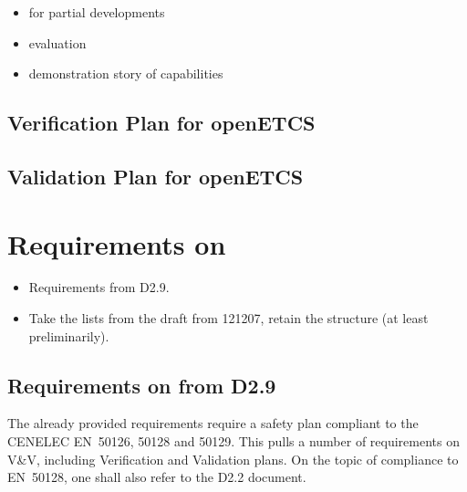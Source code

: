 \documentclass{template/openetcs_report}
\begin{document}
{\it
  \begin{itemize}
  \item \vv for partial developments
  \item evaluation
  \item demonstration story of capabilities
  \end{itemize}
}


\section{Verification Plan for openETCS}
\label{sec:verif-plan-open}

\section{Validation Plan for openETCS}
\label{sec:valid-plan-open}





\appendix
\chapter{Requirements on \VV}

{\it
  \begin{itemize}
  \item Requirements from D2.9.
  \item Take the lists from the draft from 121207, retain the structure (at
    least preliminarily). 
  \end{itemize}
}

\section{Requirements on \VV from D2.9}
\label{sec:requirements-vv-D29}

The already provided requirements require a
safety plan compliant to the CENELEC EN~50126, 50128 and 50129.  This
pulls a number of requirements on V\&V, including Verification and
Validation plans. On the topic of compliance to EN~50128, one shall
also refer to the D2.2 document.


\end{document}
